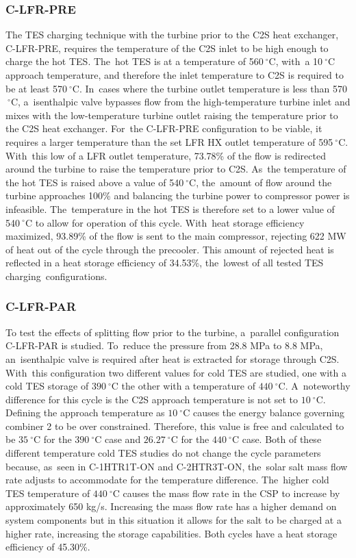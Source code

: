 \documentclass[sustainability,article,accept,moreauthors,pdftex]{Definitions/mdpi}
\begin{document}
\begin{paracol}{2}
\subsubsection{C-LFR-PRE}
The TES charging technique with the turbine prior to the C2S heat exchanger, C-LFR-PRE, requires the temperature of the C2S inlet to be high enough to charge the hot TES. The~hot TES is at a temperature of 560$~^{\circ}$C, with~a 10$~^{\circ}$C approach temperature, and therefore the inlet temperature to C2S is required to be at least 570$~^{\circ}$C. In~cases where the turbine outlet temperature is less than 570$~^{\circ}$C, a~isenthalpic valve bypasses flow from the high-temperature turbine inlet and mixes with the low-temperature turbine outlet raising the temperature prior to the C2S heat exchanger. For~the C-LFR-PRE configuration to be viable, it requires a larger temperature than the set LFR HX outlet temperature of 595$~^{\circ}$C. With~this low of a LFR outlet temperature, 73.78\% of the flow is redirected around the turbine to raise the temperature prior to C2S. As~the temperature of the hot TES is raised above a value of 540$~^{\circ}$C, the~amount of flow around the turbine approaches 100\% and balancing the turbine power to compressor power is infeasible. The~temperature in the hot TES is therefore set to a lower value of 540$~^{\circ}$C to allow for operation of this cycle. With~heat storage efficiency maximized, 93.89\% of the flow is sent to the main compressor, rejecting 622 MW of heat out of the cycle through the precooler. This amount of rejected heat is reflected in a heat storage efficiency of 34.53\%, the~lowest of all tested TES charging~configurations.

\subsubsection{C-LFR-PAR}

To test the effects of splitting flow prior to the turbine, a~parallel configuration C-LFR-PAR is studied. To~reduce the pressure from 28.8 MPa to 8.8 MPa, an~isenthalpic valve is required after heat is extracted for storage through C2S. With~this configuration two different values for cold TES are studied, one with a cold TES storage of $390~^{\circ}$C the other with a temperature of $440~^{\circ}$C. A~noteworthy difference for this cycle is the C2S approach temperature is not set to $10~^{\circ}$C. Defining the approach temperature as $10~^{\circ}$C causes the energy balance governing combiner 2 to be over constrained. Therefore, this value is free and calculated to be $35~^{\circ}$C for the $390~^{\circ}$C case and $26.27~^{\circ}$C for the $440~^{\circ}$C case. Both of these different temperature cold TES studies do not change the cycle parameters because, as~seen in C-1HTR1T-ON and C-2HTR3T-ON, the~solar salt mass flow rate adjusts to accommodate for the temperature difference. The~higher cold TES temperature of $440~^{\circ}$C causes the mass flow rate in the CSP to increase by approximately 650 kg/s. Increasing the mass flow rate has a higher demand on system components but in this situation it allows for the salt to be charged at a higher rate, increasing the storage capabilities. Both cycles have a heat storage efficiency of 45.30\%.


\end{paracol}
\end{document}
